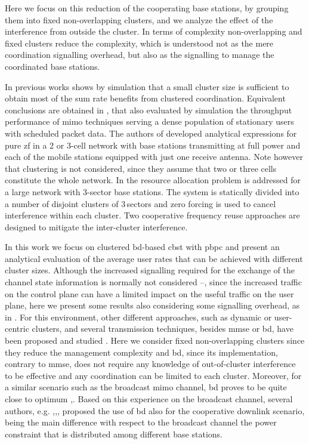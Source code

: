 Here we focus on this reduction of the cooperating base stations, by grouping them into fixed non-overlapping clusters, and we analyze the effect of the interference from outside the cluster. 
In terms of complexity non-overlapping and fixed clusters reduce the complexity, which is understood not as the mere coordination signalling overhead, but also as the signalling to manage the coordinated base stations.

In previous works \cite{zhang09} shows by simulation that a small cluster size is sufficient to obtain most of the sum rate benefits from clustered coordination. Equivalent conclusions are obtained in \cite{huang09}, that also evaluated by
simulation the throughput performance of \gls{mimo} techniques serving a dense population of stationary users with scheduled packet data.
The authors of \cite{zhang10} developed analytical expressions for pure \gls{zf} in a 2 or 3-cell network with base stations transmitting at full power and each of the mobile stations equipped with just one receive antenna.
Note however that clustering is not considered, since they assume that two or three cells constitute the whole network.
In \cite{li12} the resource allocation problem is addressed for a large network with 3-sector base stations. The system is statically divided into a number of disjoint clusters of 3\,sectors and zero forcing is used to cancel interference within each cluster. Two cooperative frequency reuse approaches are designed to mitigate the inter-cluster interference.

In this work we focus on clustered \gls{bd}-based \gls{cbst} with \gls{pbpc} and present an analytical evaluation of the average user rates that can be achieved with different cluster sizes. 
Although the increased signalling required for the exchange of the channel state information is normally not considered \cite{sun11}--\cite{huang09}, since the increased traffic on the control plane can have a limited impact on the useful traffic on the user plane, here we present some results also considering some signalling overhead, as in \cite{lozano13}.
  For this environment, other different approaches, such as dynamic or user-centric clusters, and several transmission techniques, besides \gls{mmse} or \gls{bd}, have been proposed and studied \cite{bjornson13}. Here we consider fixed non-overlapping clusters since they reduce the management complexity and \gls{bd}, since its implementation, contrary to \gls{mmse}, does not require any knowledge of out-of-cluster interference to be effective and any coordination can be limited to each cluster. Moreover, for a similar scenario such as the broadcast \gls{mimo} channel, \gls{bd} proves to be quite close to optimum \cite{caire03},\cite{boccardi07b}. Based on this experience on the broadcast channel, several authors, e.g. \cite{shim08},\cite{zhang09},\cite{armada11b}, proposed the use of \gls{bd} also for the cooperative downlink scenario, being the main difference with respect to the broadcast channel the power constraint that is distributed among different base stations.

